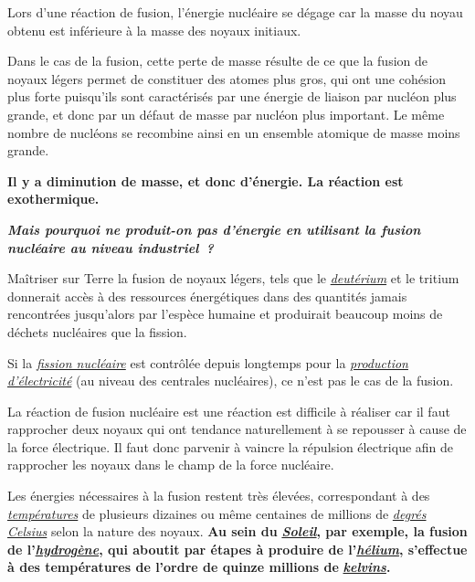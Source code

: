 Lors d'une réaction de fusion, l'énergie nucléaire se dégage car la
masse du noyau obtenu est inférieure à la masse des noyaux initiaux.

Dans le cas de la fusion, cette perte de masse résulte de ce que la
fusion de noyaux légers permet de constituer des atomes plus gros, qui
ont une cohésion plus forte puisqu'ils sont caractérisés par une énergie
de liaison par nucléon plus grande, et donc par un défaut de masse par
nucléon plus important. Le même nombre de nucléons se recombine ainsi en
un ensemble atomique de masse moins grande.

\textbf{Il y a diminution de masse, et donc d'énergie. La réaction est
exothermique.}

\emph{\textbf{Mais pourquoi ne produit-on pas d'énergie en utilisant la
fusion nucléaire au niveau industriel~?}}

Maîtriser sur Terre la fusion de noyaux légers, tels que le
\href{https://fr.wikipedia.org/wiki/Deut\%C3\%A9rium}{\emph{\emph{deutérium}}}
et le tritium donnerait accès à des ressources énergétiques dans des
quantités jamais rencontrées jusqu'alors par l'espèce humaine et
produirait beaucoup moins de déchets nucléaires que la fission.

Si la
\href{https://fr.wikipedia.org/wiki/Fission_nucl\%C3\%A9aire}{\emph{\emph{fission
nucléaire}}} est contrôlée depuis longtemps pour la
\href{https://fr.wikipedia.org/wiki/Production_d\%27\%C3\%A9lectricit\%C3\%A9}{\emph{\emph{production
d'électricité}}} (au niveau des centrales nucléaires), ce n'est pas le
cas de la fusion.

La réaction de fusion nucléaire est une réaction est difficile à
réaliser car il faut rapprocher deux noyaux qui ont tendance
naturellement à se repousser à cause de la force électrique. Il faut
donc parvenir à vaincre la répulsion électrique afin de rapprocher les
noyaux dans le champ de la force nucléaire.

Les énergies nécessaires à la fusion restent très élevées, correspondant
à des
\href{https://fr.wikipedia.org/wiki/Temp\%C3\%A9rature}{\emph{\emph{températures}}}
de plusieurs dizaines ou même centaines de millions de
\href{https://fr.wikipedia.org/wiki/Degr\%C3\%A9_Celsius}{\emph{\emph{degrés
Celsius}}} selon la nature des noyaux. \textbf{Au sein du
}\href{https://fr.wikipedia.org/wiki/Soleil}{\emph{\emph{\textbf{Soleil}}}}\textbf{,
par exemple, la fusion de
l'}\href{https://fr.wikipedia.org/wiki/Hydrog\%C3\%A8ne}{\emph{\emph{\textbf{hydrogène}}}}\textbf{,
qui aboutit par étapes à produire de
l'}\href{https://fr.wikipedia.org/wiki/H\%C3\%A9lium}{\emph{\emph{\textbf{hélium}}}}\textbf{,
s'effectue à des températures de l'ordre de quinze millions de
}\href{https://fr.wikipedia.org/wiki/Kelvin}{\emph{\emph{\textbf{kelvins}}}}\textbf{.
}

